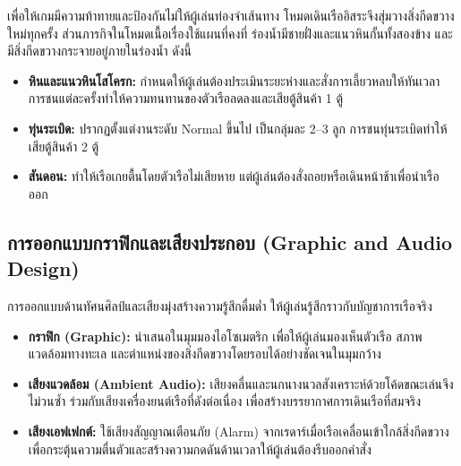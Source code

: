 เพื่อให้เกมมีความท้าทายและป้องกันไม่ให้ผู้เล่นท่องจำเส้นทาง โหมดเดินเรืออิสระจึงสุ่มวางสิ่งกีดขวางใหม่ทุกครั้ง ส่วนภารกิจในโหมดเนื้อเรื่องใช้แผนที่คงที่ ร่องน้ำมีชายฝั่งและแนวหินกั้นทั้งสองข้าง และมีสิ่งกีดขวางกระจายอยู่ภายในร่องน้ำ ดังนี้

\begin{itemize}
    \item \textbf{หินและแนวหินโสโครก:} กำหนดให้ผู้เล่นต้องประเมินระยะห่างและสั่งการเลี้ยวหลบให้ทันเวลา การชนแต่ละครั้งทำให้ความทนทานของตัวเรือลดลงและเสียตู้สินค้า 1 ตู้
    \item \textbf{ทุ่นระเบิด:} ปรากฏตั้งแต่งานระดับ Normal ขึ้นไป เป็นกลุ่มละ 2--3 ลูก การชนทุ่นระเบิดทำให้เสียตู้สินค้า 2 ตู้
    \item \textbf{สันดอน:} ทำให้เรือเกยตื้นโดยตัวเรือไม่เสียหาย แต่ผู้เล่นต้องสั่งถอยหรือเดินหน้าช้าเพื่อนำเรือออก
\end{itemize}

\subsection{การออกแบบกราฟิกและเสียงประกอบ (Graphic and Audio Design)}

การออกแบบด้านทัศนศิลป์และเสียงมุ่งสร้างความรู้สึกดื่มด่ำ ให้ผู้เล่นรู้สึกราวกับบัญชาการเรือจริง

\begin{itemize}
    \item \textbf{กราฟิก (Graphic):} นำเสนอในมุมมองไอโซเมตริก เพื่อให้ผู้เล่นมองเห็นตัวเรือ สภาพแวดล้อมทางทะเล และตำแหน่งของสิ่งกีดขวางโดยรอบได้อย่างชัดเจนในมุมกว้าง
    \item \textbf{เสียงแวดล้อม (Ambient Audio):} เสียงคลื่นและนกนางนวลสังเคราะห์ด้วยโค้ดขณะเล่นจึงไม่วนซ้ำ ร่วมกับเสียงเครื่องยนต์เรือที่ดังต่อเนื่อง เพื่อสร้างบรรยากาศการเดินเรือที่สมจริง
    \item \textbf{เสียงเอฟเฟกต์:} ใช้เสียงสัญญาณเตือนภัย (Alarm) จากเรดาร์เมื่อเรือเคลื่อนเข้าใกล้สิ่งกีดขวาง เพื่อกระตุ้นความตื่นตัวและสร้างความกดดันด้านเวลาให้ผู้เล่นต้องรีบออกคำสั่ง
\end{itemize}